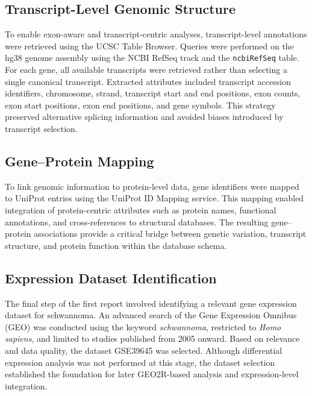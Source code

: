 \documentclass[12pt]{article}
\begin{document}
	\subsection*{Transcript-Level Genomic Structure}
	
	To enable exon-aware and transcript-centric analyses, transcript-level annotations were retrieved using the UCSC Table Browser. Queries were performed on the hg38 genome assembly using the NCBI RefSeq track and the \texttt{ncbiRefSeq} table. For each gene, all available transcripts were retrieved rather than selecting a single canonical transcript. Extracted attributes included transcript accession identifiers, chromosome, strand, transcript start and end positions, exon counts, exon start positions, exon end positions, and gene symbols. This strategy preserved alternative splicing information and avoided biases introduced by transcript selection.
	
	\subsection*{Gene–Protein Mapping}
	
	To link genomic information to protein-level data, gene identifiers were mapped to UniProt entries using the UniProt ID Mapping service. This mapping enabled integration of protein-centric attributes such as protein names, functional annotations, and cross-references to structural databases. The resulting gene–protein associations provide a critical bridge between genetic variation, transcript structure, and protein function within the database schema.
	
	\subsection*{Expression Dataset Identification}
	
	The final step of the first report involved identifying a relevant gene expression dataset for schwannoma. An advanced search of the Gene Expression Omnibus (GEO) was conducted using the keyword \textit{schwannoma}, restricted to \textit{Homo sapiens}, and limited to studies published from 2005 onward. Based on relevance and data quality, the dataset GSE39645 was selected. Although differential expression analysis was not performed at this stage, the dataset selection established the foundation for later GEO2R-based analysis and expression-level integration.
	
\end{document}
